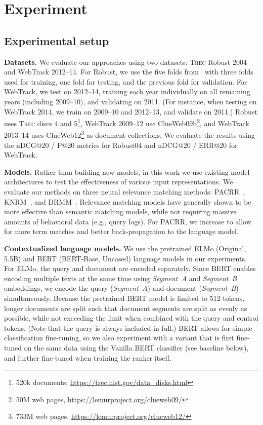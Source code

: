 \documentclass[sigconf]{acmart}
\begin{document}
 \section{Experiment}

\subsection{Experimental setup}


\textbf{Datasets.}
We evaluate our approaches using two datasets: \textsc{Trec} Robust 2004 and WebTrack 2012--14. For Robust, we use the five folds from~\cite{huston2014parameters} with three folds used for training, one fold for testing, and the previous fold for validation. For WebTrack, we test on 2012--14, training each year individually on all remaining years (including 2009--10), and validating on 2011. (For instance, when testing on WebTrack 2014, we train on 2009--10 and 2012--13, and validate on 2011.) Robust uses \textsc{Trec} discs 4 and 5\footnote{520k documents; \url{https://trec.nist.gov/data_disks.html}}, WebTrack 2009--12 use ClueWeb09b\footnote{50M web pages, \url{https://lemurproject.org/clueweb09/}}, and WebTrack 2013--14 uses ClueWeb12\footnote{733M web pages, \url{https://lemurproject.org/clueweb12/}} as document collections.
We evaluate the results using the nDCG@20 / P@20 metrics for Robust04 and nDCG@20 / ERR@20 for WebTrack.

\textbf{Models.} Rather than building new models, in this work we use existing model architectures to test the effectiveness of various input representations. We evaluate our methods on three neural relevance matching methods: PACRR~\cite{Hui2018CoPACRRAC}, KNRM~\cite{Xiong2017EndtoEndNA}, and DRMM~\cite{Guo2016ADR}. Relevance matching models have generally shown to be more effective than semantic matching models, while not requiring massive amounts of behavioral data (e.g., query logs). For PACRR, we increase  to allow for more term matches and better back-propagation to the  language model.

\textbf{Contextualized language models.}
We use the pretrained ELMo (Original, 5.5B) and BERT (BERT-Base, Uncased) language models in our experiments. For ELMo, the query and document are encoded separately. Since BERT enables encoding multiple texts at the same time using \textit{Segment~A} and \textit{Segment~B} embeddings, we encode the query (\textit{Segment~A}) and document (\textit{Segment~B}) simultaneously. Because the pretrained BERT model is limited to 512 tokens, longer documents are split such that document segments are split as evenly as possible, while not exceeding the limit when combined with the query and control tokens. (Note that the query is always included in full.) BERT allows for simple classification fine-tuning, so we also experiment with a variant that is first fine-tuned on the same data using the Vanilla BERT classifier (see baseline below), and further fine-tuned when training the ranker itself.
\end{document}
